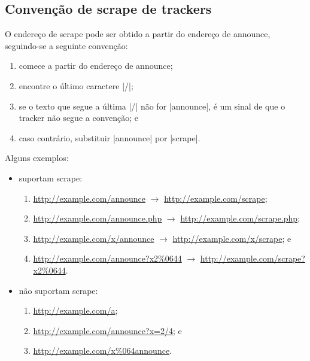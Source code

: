 
\subsection*{Convenção de scrape de trackers}

O endereço de \gls*{scrape} pode ser obtido a partir do endereço de \gls*{announce},
seguindo-se a seguinte convenção:

\begin{enumerate}
    \item comece a partir do endereço de \gls*{announce};

    \item encontre o último caractere \sverb|/|;

    \item se o texto que segue a última \sverb|/| não for \sverb|announce|, é um sinal
        de que o \gls*{tracker} não segue a convenção; e

    \item caso contrário, substituir \sverb|announce| por \sverb|scrape|.
\end{enumerate}

Alguns exemplos:

\begin{itemize}
    \item suportam scrape:
        \begin{enumerate}
            \item \url{http://example.com/announce} $\rightarrow$
                \url{http://example.com/scrape};
            \item \url{http://example.com/announce.php} $\rightarrow$
                \url{http://example.com/scrape.php};
            \item \url{http://example.com/x/announce} $\rightarrow$
                \url{http://example.com/x/scrape}; e
            \item \url{http://example.com/announce?x2\%0644} $\rightarrow$
                \url{http://example.com/scrape?x2\%0644}.
        \end{enumerate}

    \item não suportam scrape:
        \begin{enumerate}
            \item \url{http://example.com/a};
            \item \url{http://example.com/announce?x=2/4}; e
            \item \url{http://example.com/x\%064announce}.
        \end{enumerate}
\end{itemize}